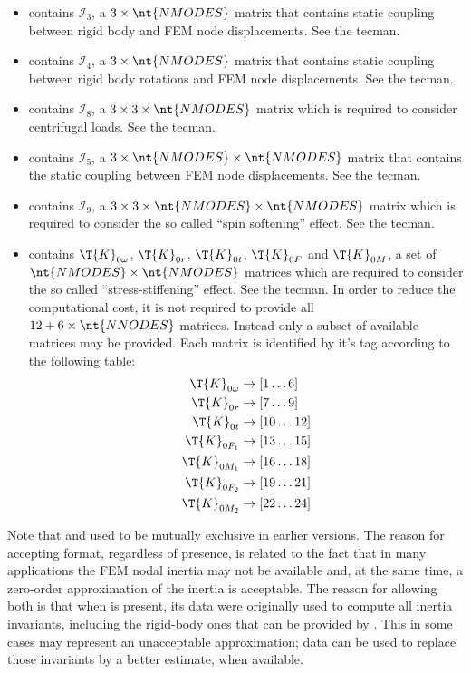\begin{itemize}
\item {} contains $\mathcal{I}_3$, a $3 \times \nt{NMODES}$ matrix that contains static coupling between rigid body and FEM node displacements. See the tecman.
\item {} contains $\mathcal{I}_4$, a $3 \times \nt{NMODES}$ matrix that contains static coupling between rigid body rotations and FEM node displacements. See the tecman.
\item {} contains $\mathcal{I}_8$, a $3 \times 3 \times \nt{NMODES}$ matrix which is required to consider centrifugal loads. See the tecman.
\item {} contains $\mathcal{I}_5$, a $3 \times \nt{NMODES} \times \nt{NMODES}$ matrix that contains the static coupling between FEM node displacements. See the tecman.
\item {} contains $\mathcal{I}_9$, a $3 \times 3 \times \nt{NMODES} \times \nt{NMODES}$ matrix which is required to consider the so called ``spin softening'' effect. See the tecman.
\item {} contains $\T{K}_{0\omega}$, $\T{K}_{0r}$, $\T{K}_{0t}$, $\T{K}_{0F}$ and $\T{K}_{0M}$, a set of $\nt{NMODES} \times \nt{NMODES}$ matrices which are required to consider the so called ``stress-stiffening'' effect. See the tecman. In order to reduce the computational cost, it is not required to provide all $12 + 6 \times \nt{NNODES}$ matrices. Instead only a subset of available matrices may be provided. Each matrix is identified by it's  tag according to the following table:
  \begin{align}
    \T{K}_{0\omega}&\rightarrow\left[1\hdots6\right] \nonumber \\
    \T{K}_{0r}&\rightarrow\left[7\hdots9\right] \nonumber \\
    \T{K}_{0t}&\rightarrow\left[10\hdots12\right] \nonumber \\
    \T{K}_{0F_1}&\rightarrow\left[13\hdots15\right] \nonumber \\
    \T{K}_{0M_1}&\rightarrow\left[16\hdots18\right] \nonumber \\
    \T{K}_{0F_2}&\rightarrow\left[19\hdots21\right] \nonumber \\
    \T{K}_{0M_2}&\rightarrow\left[22\hdots24\right]
  \end{align}
\end{itemize}

Note that  and 
used to be mutually exclusive in earlier versions.
The reason for accepting  format,
regardless of  presence, is related
to the fact that in many applications the FEM nodal inertia
may not be available and, at the same time, a zero-order approximation
of the inertia is acceptable.
The reason for allowing both is that when 
is present, its data were originally used to compute all inertia invariants,
including the rigid-body ones that can be provided by .
This in some cases may represent an unacceptable approximation;
 data can be used to replace those invariants
by a better estimate, when available.

